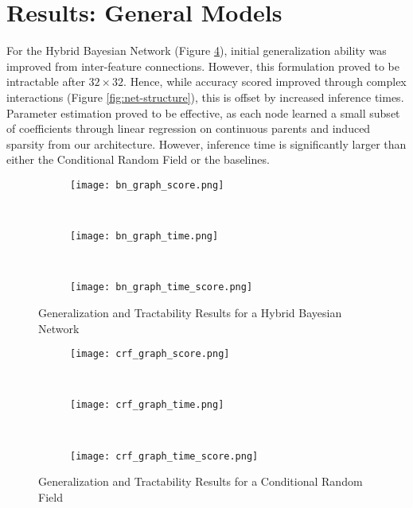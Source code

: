 \documentclass{article}
\begin{document}

\section{Results: General Models}
\label{sec:results-general}
For the Hybrid Bayesian Network (Figure \ref{fig:HBN}), initial generalization
ability was improved from inter-feature connections.
However, this formulation proved to be intractable
after $32 \times 32$. Hence, while accuracy scored improved through
complex interactions (Figure \ref{fig:net-structure}), this is
offset by increased inference times. Parameter estimation proved to be effective,
as each node learned a small subset of coefficients through linear regression
on continuous parents and induced sparsity from our architecture.
However, inference time is significantly larger than either the
Conditional Random Field or the baselines.

\begin{figure}
  \centering
  \begin{subfigure}[b]{0.3\textwidth}
    \centering
    \texttt{[image: bn\_graph\_score.png]}
    \caption*{}
    \label{fig:bn_graph_score}
  \end{subfigure}
  ~
  \begin{subfigure}[b]{0.3\textwidth}
    \centering
    \texttt{[image: bn\_graph\_time.png]}
    \caption*{}
    \label{fig:bn_graph_time}
  \end{subfigure}
  ~
  \begin{subfigure}[b]{0.3\textwidth}
    \centering
    \texttt{[image: bn\_graph\_time\_score.png]}
    \caption*{}
    \label{fig:bn_graph_time_score}
  \end{subfigure}
  \vspace{-20pt}
  \caption{Generalization and Tractability Results for a Hybrid Bayesian Network}
  \label{fig:HBN}
\end{figure}

\begin{figure}
  \centering
  \begin{subfigure}[b]{0.3\textwidth}
    \centering
    \texttt{[image: crf\_graph\_score.png]}
    \caption*{}
    \label{fig:crf_graph_score}
  \end{subfigure}
  ~
  \begin{subfigure}[b]{0.3\textwidth}
    \centering
    \texttt{[image: crf\_graph\_time.png]}
    \caption*{}
    \label{fig:crf_graph_time}
  \end{subfigure}
  ~
  \begin{subfigure}[b]{0.3\textwidth}
    \centering
    \texttt{[image: crf\_graph\_time\_score.png]}
    \caption*{}
    \label{fig:crf_graph_time_score}
  \end{subfigure}
  \vspace{-20pt}
  \caption{Generalization and Tractability Results for a Conditional Random Field}
  \label{fig:CRF}
\end{figure}
\end{document}
